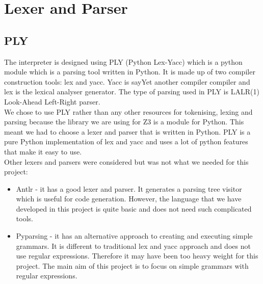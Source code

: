 \documentclass[a4paper]{report}
\begin{document}
\section{Lexer and Parser} 
\subsection{PLY}
The interpreter is designed using PLY\cite{ply} (Python Lex-Yacc) which is a python module which is a parsing tool written in Python. It is made up of two compiler construction tools: lex and yacc\cite{plylexyacc}. Yacc is say{Yet another compiler compiler} and lex is the lexical analyser generator. The type of parsing used in PLY is LALR(1)\cite{lalr} Look-Ahead Left-Right parser.\\
We chose to use PLY rather than any other resources for tokenising, lexing and parsing because the library we are using for Z3 is a module for Python. This meant we had to choose a lexer and parser that is written in Python. PLY is a pure Python implementation of lex and yacc and uses a lot of python features that make it easy to use. \\
Other lexers and parsers were considered but was not what we needed for this project:
\begin{itemize}
\item Antlr\cite{antlr} - it has a good lexer and parser. It generates a parsing tree visitor which is useful for code generation. However, the language that we have developed in this project is quite basic and does not need such complicated tools.
\item Pyparsing\cite{pyparsing} - it has an alternative approach to creating and executing simple grammars. It is different to traditional lex and yacc approach and does not use regular expressions. Therefore it may have been too heavy weight for this project. The main aim of this project is to focus on simple grammars with regular expressions.
\end{itemize}
\end{document}
